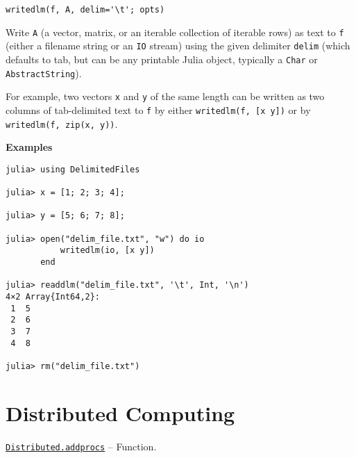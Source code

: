 \begin{adjustwidth}{2em}{0pt}


\begin{verbatim}
writedlm(f, A, delim='\t'; opts)
\end{verbatim}

Write \texttt{A} (a vector, matrix, or an iterable collection of iterable rows) as text to \texttt{f} (either a filename string or an \texttt{IO} stream) using the given delimiter \texttt{delim} (which defaults to tab, but can be any printable Julia object, typically a \texttt{Char} or \texttt{AbstractString}).

For example, two vectors \texttt{x} and \texttt{y} of the same length can be written as two columns of tab-delimited text to \texttt{f} by either \texttt{writedlm(f, [x y])} or by \texttt{writedlm(f, zip(x, y))}.

\textbf{Examples}


\begin{verbatim}
julia> using DelimitedFiles

julia> x = [1; 2; 3; 4];

julia> y = [5; 6; 7; 8];

julia> open("delim_file.txt", "w") do io
           writedlm(io, [x y])
       end

julia> readdlm("delim_file.txt", '\t', Int, '\n')
4×2 Array{Int64,2}:
 1  5
 2  6
 3  7
 4  8

julia> rm("delim_file.txt")
\end{verbatim}



\end{adjustwidth}

\hypertarget{10284651762813257412}{}


\chapter{Distributed Computing}


\hypertarget{2657399037748470653}{} 
\hyperlink{2657399037748470653}{\texttt{Distributed.addprocs}}  -- {Function.}

